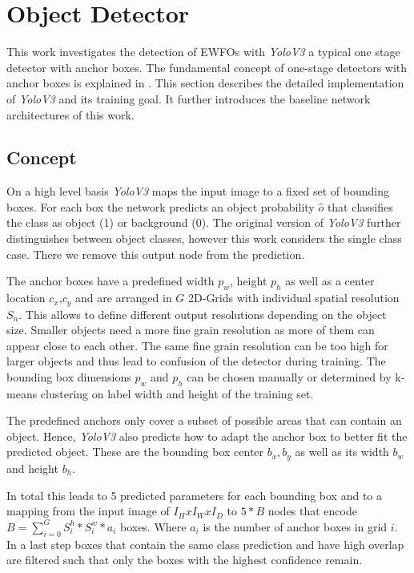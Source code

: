\section{Object Detector}

This work investigates the detection of \acp{EWFO} with \textit{YoloV3} a typical one stage detector with anchor boxes. The fundamental concept of one-stage detectors with anchor boxes is explained in . This section describes the detailed implementation of \textit{YoloV3} and its training goal. It further introduces the baseline network architectures of this work.

\subsection{Concept}

On a high level basis \textit{YoloV3} maps the input image to a fixed set of bounding boxes. For each box the network predicts an object probability $\hat o$ that classifies the class as object (1) or background (0). The original version of \textit{YoloV3} further distinguishes between object classes, however this work considers the single class case. There we remove this output node from the prediction. 

The anchor boxes have a predefined width $p_w$, height $p_h$ as well as a center location $c_x$,$c_y$ and are arranged in $G$ 2D-Grids with individual spatial resolution $S_n$. This allows to define different output resolutions depending on the object size. Smaller objects need a more fine grain resolution as more of them can appear close to each other. The same fine grain resolution can be too high for larger objects and thus lead to confusion of the detector during training. The bounding box dimensions $p_w$ and $p_h$ can be chosen manually or determined by k-means clustering on label width and height of the training set.

The predefined anchors only cover a subset of possible areas that can contain an object. Hence, \textit{YoloV3} also predicts how to adapt the anchor box to better fit the predicted object. These are the bounding box center $b_x,b_y$ as well as its width $b_w$ and height $b_h$. 

In total this leads to 5 predicted parameters for each bounding box and to a mapping from the input image of $I_HxI_WxI_D$ to $5*B$ nodes that encode $B=\sum_{i=0}^{G}S^h_i*S^w_i*a_i$ boxes. Where $a_i$ is the number of anchor boxes in grid $i$. In a last step boxes that contain the same class prediction and have high overlap are filtered such that only the boxes with the highest confidence remain.	

